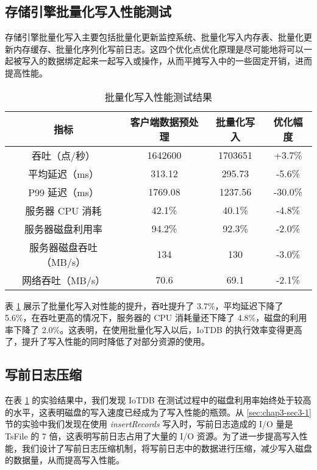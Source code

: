 \subsection{存储引擎批量化写入性能测试}
存储引擎批量化写入主要包括批量化更新监控系统、批量化写入内存表、批量化更新内存缓存、批量化序列化写前日志。这四个优化点优化原理是尽可能地将可以一起被写入的数据绑定起来一起写入或操作，从而平摊写入中的一些固定开销，进而提高性能。
\begin{table}
  \centering
  \caption{批量化写入性能测试结果}
  \begin{tabular}{cccc}
    \toprule 
    指标 & 客户端数据预处理 & 批量化写入 & 优化幅度 \\ 
    \midrule  
    吞吐（点/秒） & 1642600 & 1703651 & +3.7\%\\  
    平均延迟（ms） & 313.12 & 295.73 & -5.6\%\\  
    P99 延迟（ms） & 1769.08 & 1237.56 & -30.0\% \\  
    服务器 CPU 消耗 & 42.1\% & 40.1\% & -4.8\%\\  
    服务器磁盘利用率 & 94.2\% & 92.3\% & -2.0\%\\  
    服务器磁盘吞吐（MB/s） & 134 & 130 & -3.0\% \\  
    网络吞吐（MB/s） & 70.6 & 69.1 & -2.1\%\\  
    \bottomrule
  \end{tabular}
  \label{tabular:batch-write-performance}
\end{table}

表 \ref{tabular:batch-write-performance} 展示了批量化写入对性能的提升，吞吐提升了 3.7\%，平均延迟下降了 5.6\%，在吞吐更高的情况下，服务器的 CPU 消耗量还下降了 4.8\%，磁盘的利用率下降了 2.0\%。这表明，在使用批量化写入以后，IoTDB 的执行效率变得更高了，提升了写入性能的同时降低了对部分资源的使用。

\subsection{写前日志压缩}
在表 \ref{tabular:batch-write-performance} 的实验结果中，我们发现 IoTDB 在测试过程中的磁盘利用率始终处于较高的水平，这表明磁盘的写入速度已经成为了写入性能的瓶颈。从 \ref{sec:chap3-sec3-1} 节的实验中我们发现在使用 \emph{insertRecords} 写入时，写前日志造成的 I/O 量是 TsFile 的 7 倍，这表明写前日志占用了大量的 I/O 资源。为了进一步提高写入性能，我们设计了写前日志压缩机制，将写前日志中的数据进行压缩，减少写入磁盘的数据量，从而提高写入性能。

